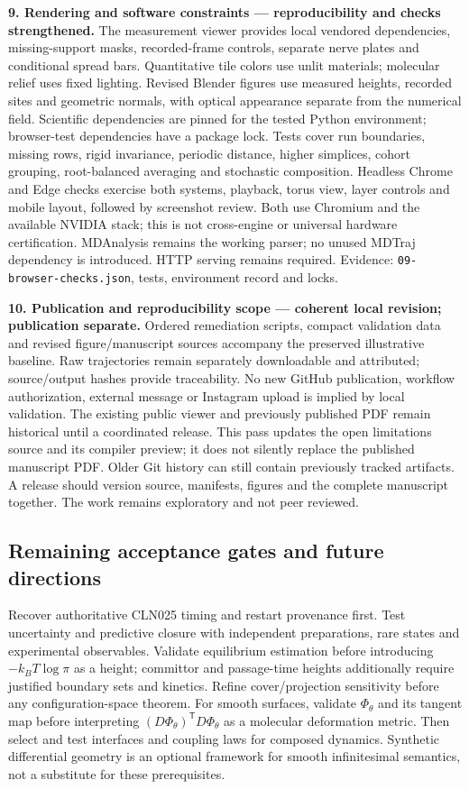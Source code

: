 \documentclass[11pt]{article}
\def\AtlasSectionEnd{\end{document}}
\begin{document}
\textbf{9. Rendering and software constraints --- reproducibility and checks strengthened.}
The measurement viewer provides local vendored dependencies, missing-support
masks, recorded-frame controls, separate nerve plates and conditional spread
bars. Quantitative tile colors use unlit materials; molecular relief uses
fixed lighting. Revised Blender figures use measured heights, recorded sites
and geometric normals, with optical appearance separate from the numerical field.
Scientific dependencies are pinned for the tested Python environment;
browser-test dependencies have a package lock. Tests cover run boundaries,
missing rows, rigid invariance, periodic distance, higher simplices, cohort
grouping, root-balanced averaging and stochastic composition.
Headless Chrome and Edge checks exercise both systems, playback, torus view,
layer controls and mobile layout, followed by screenshot review.
Both use Chromium and the available NVIDIA stack; this is not cross-engine
or universal hardware certification. MDAnalysis remains the working parser;
no unused MDTraj dependency is introduced. HTTP serving remains required.
Evidence: \texttt{09-browser-checks.json}, tests, environment record and locks.

\textbf{10. Publication and reproducibility scope --- coherent local revision; publication separate.}
Ordered remediation scripts, compact validation data and revised figure/manuscript
sources accompany the preserved illustrative baseline. Raw trajectories remain
separately downloadable and attributed; source/output hashes provide traceability.
No new GitHub publication, workflow authorization, external message or Instagram
upload is implied by local validation. The existing public viewer and previously
published PDF remain historical until a coordinated release.
This pass updates the open limitations source and its compiler preview; it
does not silently replace the published manuscript PDF. Older Git history
can still contain previously tracked artifacts. A release should version source,
manifests, figures and the complete manuscript together.
The work remains exploratory and not peer reviewed.

\subsection*{Remaining acceptance gates and future directions}
Recover authoritative CLN025 timing and restart provenance first.
Test uncertainty and predictive closure with independent preparations,
rare states and experimental observables. Validate equilibrium estimation
before introducing $-k_BT\log\pi$ as a height; committor and passage-time
heights additionally require justified boundary sets and kinetics.
Refine cover/projection sensitivity before any configuration-space theorem.
For smooth surfaces, validate $\Phi_\theta$ and its tangent map before
interpreting $(D\Phi_\theta)^{\mathsf T}D\Phi_\theta$ as a molecular
deformation metric. Then select and test interfaces and coupling laws for
composed dynamics. Synthetic differential geometry is an optional framework
for smooth infinitesimal semantics, not a substitute for these prerequisites.

\AtlasSectionEnd
\end{document}
